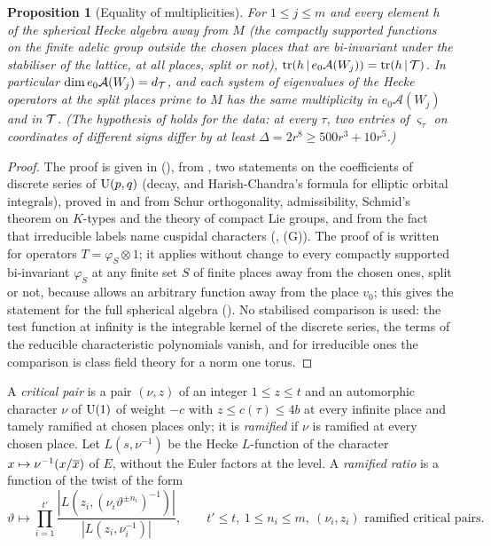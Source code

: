 \documentclass[10pt]{amsart}
\newtheorem{proposition}[theorem]{Proposition}
\theoremstyle{definition}
\theoremstyle{remark}
\begin{document}
\begin{proposition}[Equality of multiplicities]\label{au:mult}
For $1\le j\le m$ and every element $h$ of the spherical Hecke algebra away from $M$ (the
compactly supported functions on the finite adelic group outside the chosen places that are
bi-invariant under the stabiliser of the lattice, at all places, split or not),
$\operatorname{tr}(h\,|\,e_0\mathcal A(W_j))=\operatorname{tr}(h\,|\,\mathcal T)$. In particular
$\dim e_0\mathcal A(W_j)=d_{\mathcal T}$, and each system of eigenvalues of the Hecke operators at the split
places prime to $M$ has the same multiplicity in $e_0\mathcal A(W_j)$ and in $\mathcal T$. (The
hypothesis of {\cite[Proposition~4.6]{P51}} holds for the data: at every $\tau$, two entries of
$\varsigma_\tau$ on coordinates of different signs {\cite[(43)]{P51}} differ by at least
$\Delta=2r^8\ge500r^3+10r^5$.)
\end{proposition}
\begin{proof}
The proof is given in {\cite[\S4.1]{P51}} ({\cite[Proposition~4.6]{P51}}), from {\cite[Theorem~4.1]{P51}}, two
statements on the coefficients of discrete series of $\mathrm U(p,q)$ (decay, and Harish-Chandra's
formula for elliptic orbital integrals), proved in {\cite[Remark~4.3(1)]{P51}} and
{\cite[\S4.2]{P51}} from Schur orthogonality, admissibility, Schmid's theorem on $K$-types and the
theory of compact Lie groups, and from the fact
that irreducible labels name cuspidal characters ({\cite[\S4.1.8]{P51}}, (G)). The proof of
{\cite[Proposition~4.6]{P51}} is written for operators $T=\varphi_S\otimes1$; it applies without change
to every compactly supported bi-invariant $\varphi_S$ at any finite set $S$ of finite places away
from the chosen ones, split or not, because {\cite[Theorem~4.5]{P51}} allows an arbitrary function
away from the place $v_0$; this gives the statement for the full spherical algebra ({\cite[Remark~4.22]{P51}}). No
stabilised comparison is used: the test function at infinity is the integrable kernel of the
discrete series, the terms of the reducible characteristic polynomials
vanish, and for irreducible ones the comparison is class field theory for a norm one torus.
\end{proof}

A \emph{critical pair} is a pair $(\nu,z)$ of an integer $1\le z\le t$ and an automorphic
character $\nu$ of $\mathrm U(1)$ of weight $-c$ with $z\le c(\tau)\le4b$ at every infinite place and
tamely ramified at chosen places only; it is \emph{ramified} if $\nu$ is ramified at every chosen
place. Let $L(s,\nu^{-1})$ be the Hecke $L$-function of the character $x\mapsto\nu^{-1}(x/\overline{x})$ of $E$, without the Euler factors at the level. A \emph{ramified ratio} is a function of the
twist of the form
\[
\vartheta\longmapsto\prod_{i=1}^{t'}\frac{|L(z_i,(\nu_i\vartheta^{\pm n_i})^{-1})|}{|L(z_i,
\nu_i^{-1})|},\qquad t'\le t,\ 1\le n_i\le m,\ (\nu_i,z_i)\text{ ramified critical pairs.}
\]
\end{document}
